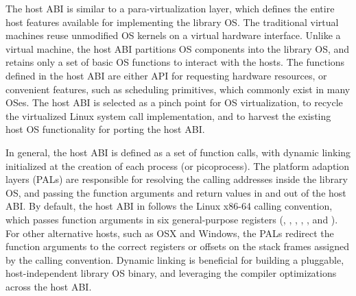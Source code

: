 The host ABI is similar to a para-virtualization layer, which defines the entire host features
available for implementing the library OS.
The traditional virtual machines reuse unmodified OS kernels on a virtual hardware interface.
Unlike a virtual machine,
the host ABI partitions OS components into the library OS, and retains only a set of basic OS functions to interact with the hosts.
The functions defined in the host ABI
are either API for requesting hardware resources, or convenient features, such as scheduling primitives, which commonly exist in many OSes.
The host ABI is selected as a pinch point for OS virtualization,
to recycle the virtualized Linux system call implementation, and to harvest the existing host OS functionality for porting the host ABI. 




In general, the host ABI is defined as a set of function calls, with dynamic linking initialized at the creation of each process (or picoprocess).
The platform adaption layers (PALs)
are responsible for
resolving the calling addresses inside the library OS, and passing the function arguments and return values in and out of the host ABI.
By default, the host ABI in \graphene{} follows the Linux x86-64 calling convention,
which passes function arguments in six general-purpose registers (, , , , , and ).
For other alternative hosts,
such as OSX and Windows, the PALs redirect
the function arguments to the correct registers or offsets on the stack frames assigned by the calling convention.
Dynamic linking is beneficial for
building a pluggable, host-independent library OS binary, and leveraging the compiler optimizations across the host ABI.





